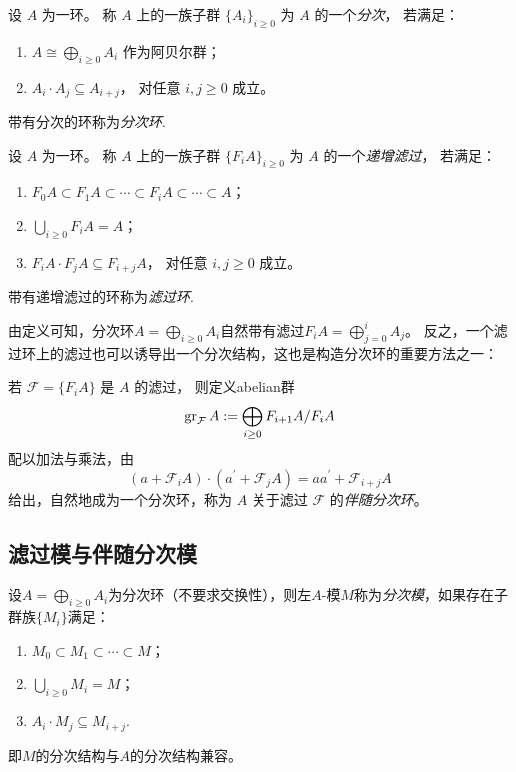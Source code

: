 \documentclass[12pt,a4paper]{ctexrep}   %
\begin{document}
\begin{definition}
    设 $A$ 为一环。 称 $A$ 上的一族子群 $\{A_i\}_{i\ge0}$ 为
    $A$ 的一个\emph{分次}，
    若满足：
    \begin{enumerate}[label=(\roman*)]
        \item
              $A\cong \bigoplus_{i\ge0}A_i$ 作为阿贝尔群；
        \item
              $A_i\cdot A_j\subseteq A_{i+j}$，
              对任意 $i,j\ge0$ 成立。
    \end{enumerate}
    带有分次的环称为\emph{分次环}.
\end{definition}


\begin{definition}
    设 $A$ 为一环。
    称 $A$ 上的一族子群 $\{F_iA\}_{i\ge0}$ 为
    $A$ 的一个\emph{递增滤过}，
    若满足：
    \begin{enumerate}[label=(\roman*)]
        \item
              $F_0A\subset F_1A\subset \cdots \subset F_iA\subset\cdots\subset A$；
        \item
              $\bigcup_{i\ge0}F_iA=A$；
        \item
              $F_iA\cdot F_jA\subseteq F_{i+j}A$，
              对任意 $i,j\ge0$ 成立。
    \end{enumerate}
    带有递增滤过的环称为\emph{滤过环}.
\end{definition}
由定义可知，分次环$A=\bigoplus_{i\ge0}A_i$自然带有滤过$F_iA=\bigoplus_{j=0}^i A_j$。
反之，一个滤过环上的滤过也可以诱导出一个分次结构，这也是构造分次环的重要方法之一：
\begin{proposition}
    若 $\mathcal{F}=\{F_iA\}$ 是 $A$ 的滤过，
    则定义abelian群
    \[
        \operatorname{gr}_{\mathcal{F}}A
        :=
        \bigoplus_{i\ge0}F_{i+1}A/F_iA
    \]
    配以加法与乘法，由
    \[
        (a+\mathcal{F}_iA)\cdot (a^\prime+\mathcal{F}_jA)
        =
        aa^\prime+\mathcal{F}_{i+j}A
    \]
    给出，自然地成为一个分次环，称为 $A$ 关于滤过 $\mathcal{F}$ 的\emph{伴随分次环}。
\end{proposition}

\subsection{滤过模与伴随分次模}

\begin{definition}
    设$A=\bigoplus_{i\ge0}A_i$为分次环（不要求交换性），则左$A$-模$M$称为\emph{分次模}，如果存在子群族$\{M_i\}$满足：
    \begin{enumerate}[label=(\roman*)]
        \item $M_0\subset M_1\subset\cdots\subset M$；
        \item $\bigcup_{i\ge0}M_i=M$；
        \item $A_i\cdot M_j\subseteq M_{i+j}$.
    \end{enumerate}
    即$M$的分次结构与$A$的分次结构兼容。
\end{definition}
\end{document}
